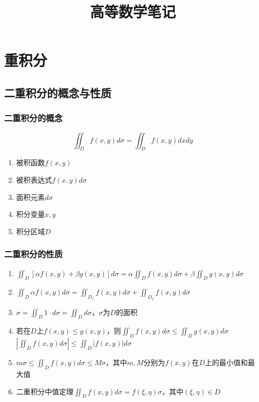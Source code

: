 \documentclass{article} %
\title{高等数学笔记}  %
\author{}   %
\date{}       %
\begin{document}
\maketitle          %

\tableofcontents
\thispagestyle{empty}
\clearpage
\setcounter{page}{1}





\section{重积分}
\subsection{二重积分的概念与性质}
\subsubsection{二重积分的概念}
$$ \iint_{D} f(x,y)d\sigma =\iint_{D} f(x,y)dxdy $$
\begin{enumerate}
    \item 被积函数$f(x,y)$
    \item 被积表达式$f(x,y)d\sigma$
    \item 面积元素$d\sigma$
    \item 积分变量$x,y$
    \item 积分区域$D$
\end{enumerate}


\subsubsection{二重积分的性质}
\begin{enumerate}
    \item $\displaystyle \iint_{D} [\alpha f(x,y)+\beta g(x,y)]d\sigma =\alpha \iint_{D} f(x,y)d\sigma + \beta \iint_{D} g(x,y)d\sigma $
    \item $\displaystyle \iint_{D} \alpha f(x,y)d\sigma =\iint_{D_1} f(x,y)d\sigma + \iint_{D_2} f(x,y)d\sigma $
    \item $\displaystyle \sigma=\iint_D 1\cdot d\sigma=\iint_D d\sigma$，$\sigma$为$D$的面积
    \item 若在$D$上$f(x,y)\leq g(x,y)$，则$\displaystyle\iint_D f(x,y)d\sigma \leq \iint_D g(x,y)d\sigma$\\
        $\displaystyle \left|\iint_D f(x,y)d\sigma \right|\leq \iint_D |f(x,y)|d\sigma $
    \item $\displaystyle m\sigma\leq\iint_D f(x,y)d\sigma\leq M\sigma$，其中$m,M$分别为$f(x,y)$在$D$上的最小值和最大值
    \item 二重积分中值定理$\displaystyle \iint_D f(x,y)d\sigma=f(\xi,\eta)\sigma$，其中$(\xi,\eta)\in D$
\end{enumerate}
\end{document}
